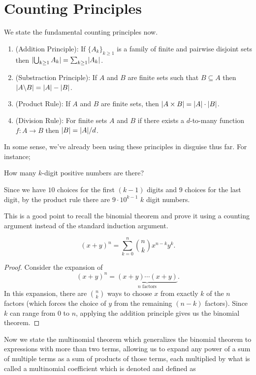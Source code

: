 \section{Counting Principles}
We state the fundamental counting principles now.
\begin{enumerate}
\item (Addition Principle): If $\{A_{k}\}_{k\geq 1}$ is a family of finite and pairwise disjoint sets then $\lvert\bigcup_{k\geq 1} A_{k}\rvert = \sum_{k\geq 1}\lvert A_{k}\rvert$.
\item (Substraction Principle): If $A$ and $B$ are finite sets such that $B\subseteq A$ then $\lvert A\backslash B\rvert = \lvert A\rvert-\lvert B\rvert$.
\item (Product Rule): If $A$ and $B$ are finite sets, then $\lvert A\times B\rvert = \lvert A\rvert\cdot\lvert B\rvert$.
\item (Division Rule): For finite sets $A$ and $B$ if there exists a $d$-to-many function $f:A\to B$ then $\lvert B\rvert=\lvert A\rvert/d$.
\end{enumerate}
In some sense, we've already been using these principles in disguise thus far. For instance;
\begin{question}
How many $k$-digit positive numbers are there?
\end{question}
\begin{solution}
Since we have $10$ choices for the first $\left(k-1\right)$ digits and $9$ choices for the last digit, by the product rule there are $9\cdot 10^{k-1}$ $k$ digit numbers.
\end{solution}
This is a good point to recall the binomial theorem and prove it using a counting argument instead of the standard induction argument.
\begin{theorem}
	\[
		\left( x+y \right)^n = \sum_{k=0}^{n}\binom{n}{k}x^{n-k}y^k
	.\] 
\end{theorem}
\begin{proof}
	Consider the expansion of
	\[
		\left( x+y \right)^n = \underbrace{\left( x+y \right) \cdots \left( x+y \right) }_{n \text{ factors}}.
	\]
	In this expansion, there are $\binom{n}{k}$ ways to choose $x$ from exactly $k$ of the $n$ factors (which forces the choice of $y$ from the remaining $(n-k)$ factors). Since $k$ can range from $0$ to $n$, applying the addition principle gives us the binomial theorem.
\end{proof}
Now we state the multinomial theorem which generalizes the binomial theorem to expressions with more than two terms, allowing us to expand any power of a sum of multiple terms as a sum of products of those terms, each multiplied by what is called a multinomial coefficient which is denoted and defined as
